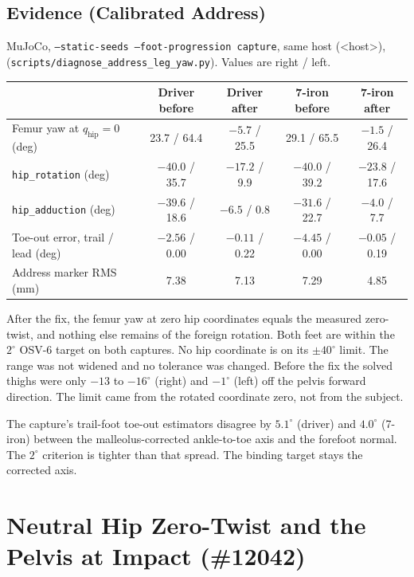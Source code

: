 \documentclass[11pt]{article}
\begin{document}
\subsection{Evidence (Calibrated Address)}
MuJoCo, \texttt{--static-seeds --foot-progression capture}, same host
(<host>), 
(\texttt{scripts/diagnose\_address\_leg\_yaw.py}). Values are right / left.

\begin{center}
\begin{tabular}{lcccc}
\toprule
 & Driver before & Driver after & 7-iron before & 7-iron after \\
\midrule
Femur yaw at $q_{\mathrm{hip}}=0$ (deg) & 23.7 / 64.4 & $-5.7$ / 25.5 & 29.1 / 65.5 & $-1.5$ / 26.4 \\
\texttt{hip\_rotation} (deg) & $-40.0$ / 35.7 & $-17.2$ / 9.9 & $-40.0$ / 39.2 & $-23.8$ / 17.6 \\
\texttt{hip\_adduction} (deg) & $-39.6$ / 18.6 & $-6.5$ / 0.8 & $-31.6$ / 22.7 & $-4.0$ / 7.7 \\
Toe-out error, trail / lead (deg) & $-2.56$ / 0.00 & $-0.11$ / 0.22 & $-4.45$ / 0.00 & $-0.05$ / 0.19 \\
Address marker RMS (mm) & 7.38 & 7.13 & 7.29 & 4.85 \\
\bottomrule
\end{tabular}
\end{center}

After the fix, the femur yaw at zero hip coordinates equals the measured
zero-twist, and nothing else remains of the foreign rotation. Both feet are
within the $2^\circ$ OSV-6 target on both captures. No hip coordinate is on
its $\pm40^\circ$ limit. The range was not widened and no tolerance was
changed. Before the fix the solved thighs were only $-13$ to $-16^\circ$
(right) and $-1^\circ$ (left) off the pelvis forward direction. The limit
came from the rotated coordinate zero, not from the subject.

The capture's trail-foot toe-out estimators disagree by $5.1^\circ$ (driver)
and $4.0^\circ$ (7-iron) between the malleolus-corrected ankle-to-toe axis and
the forefoot normal. The $2^\circ$ criterion is tighter than that spread. The
binding target stays the corrected axis.

\section{Neutral Hip Zero-Twist and the Pelvis at Impact (\#12042)}
\label{sec:neutral-twist}
\end{document}
